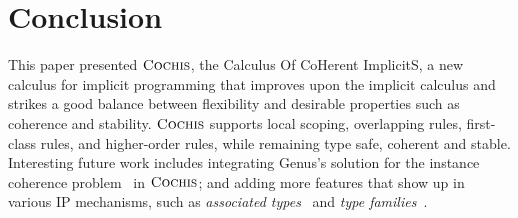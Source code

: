 \section{Conclusion}
\label{sec:conclusion}

This paper presented $\textsc{Cochis}$, the Calculus Of CoHerent ImplicitS, a new
calculus for implicit programming that improves upon the implicit calculus and
strikes a good balance between flexibility and desirable properties
such as coherence and stability.
$\textsc{Cochis}$ supports local scoping, overlapping rules, first-class
rules, and higher-order rules, while remaining type safe, coherent and
stable.
Interesting future work includes integrating Genus's solution for the
instance coherence problem~\cite{Zhang15LFO} in $\textsc{Cochis}$; and 
adding more features that show up 
in various IP mechanisms, such as \emph{associated types}~\cite{assoctypes,assoctypes2} and \emph{type
  families}~\cite{typefunc}.

 





%
% 
% 






